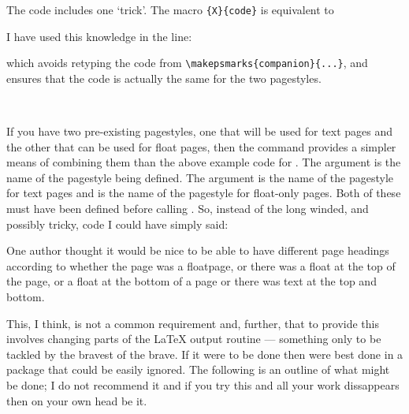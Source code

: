     The code includes one `trick'. The macro \cmd{\makepsmarks}\verb?{X}{code}?
is equivalent to
\begin{lcode}
\newcommand{\Xpshook}{code}
\end{lcode}
I have used this knowledge in the line:
\begin{lcode}
\end{lcode}
which avoids retyping the code from 
\verb?\makepsmarks{companion}{...}?,
and ensures that the code is actually the same for the two pagestyles.

\begin{syntax}
\cmd{\mergepagefloatstyle} \\
\end{syntax}
    If you have two pre-existing pagestyles, one that will be used for
text pages and the other that can be used for float pages, then the
\cmd{\mergepagefloatstyle} command provides a simpler means of 
combining
them than the above example code for . The argument
 is the name of the pagestyle being defined. The
argument 
is the name of the pagestyle for text pages and  is the
name of the pagestyle for float-only pages. Both of these must have been 
defined before calling \cmd{\mergepagefloatstyle}. So, instead of the long
winded, and possibly tricky, code I could have simply said:
\begin{lcode}
\end{lcode}


    One author thought it would be nice to be able to have different 
page headings according
to whether the page was a floatpage, or there was a float at the top of 
the page, or a float at the bottom of a page or there was text at the 
top and bottom.

    This, I think, is not a common requirement and, further, that to provide 
this involves changing parts of the LaTeX output routine --- something only
to be tackled by the bravest of the brave. If it were to be done then were
best done in a package that could be easily ignored. The following is an
outline of what might be done; I do not recommend it and if you try this 
and all your work dissappears then on your own head be it.

